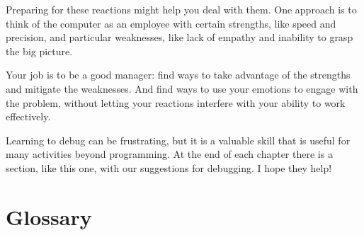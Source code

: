 Preparing for these reactions might help you deal with them.
One approach is to think of the computer as an employee with
certain strengths, like speed and precision, and
particular weaknesses, like lack of empathy and inability
to grasp the big picture.

Your job is to be a good manager: find ways to take advantage
of the strengths and mitigate the weaknesses.  And find ways
to use your emotions to engage with the problem,
without letting your reactions interfere with your ability
to work effectively.

Learning to debug can be frustrating, but it is a valuable skill
that is useful for many activities beyond programming.  At the
end of each chapter there is a section, like this one,
with our suggestions for debugging.  I hope they help!


\section{Glossary}

